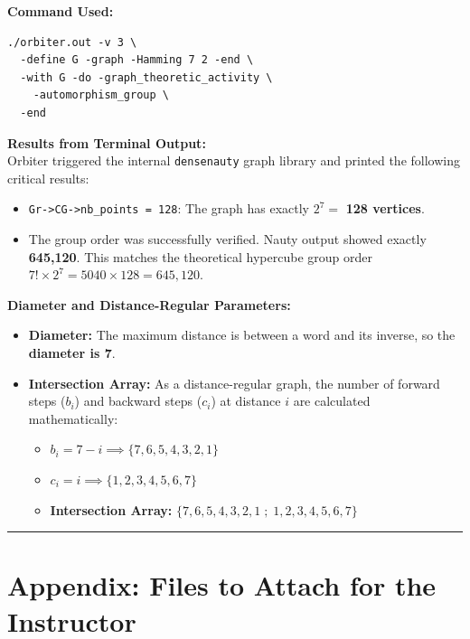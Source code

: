 \documentclass[12pt,a4paper]{article}
\begin{document}
\vspace{0.3cm}\noindent\textbf{Command Used:}
\begin{verbatim}
./orbiter.out -v 3 \
  -define G -graph -Hamming 7 2 -end \
  -with G -do -graph_theoretic_activity \
    -automorphism_group \
  -end
\end{verbatim}

\textbf{Results from Terminal Output:}\\
Orbiter triggered the internal \texttt{densenauty} graph library and printed the following critical results:
\begin{itemize}
    \item \texttt{Gr->CG->nb\_points = 128}: The graph has exactly $2^7 =$ \textbf{128 vertices}.
    \item The group order was successfully verified. Nauty output showed exactly \textbf{645,120}. This matches the theoretical hypercube group order $7! \times 2^7 = 5040 \times 128 = 645,120$.
\end{itemize}

\textbf{Diameter and Distance-Regular Parameters:}
\begin{itemize}
    \item \textbf{Diameter:} The maximum distance is between a word and its inverse, so the \textbf{diameter is 7}.
    \item \textbf{Intersection Array:} As a distance-regular graph, the number of forward steps ($b_i$) and backward steps ($c_i$) at distance $i$ are calculated mathematically:
    \begin{itemize}
        \item $b_i = 7 - i \implies \{7, 6, 5, 4, 3, 2, 1\}$
        \item $c_i = i \implies \{1, 2, 3, 4, 5, 6, 7\}$
        \item \textbf{Intersection Array:} $\{7, 6, 5, 4, 3, 2, 1 \; ; \; 1, 2, 3, 4, 5, 6, 7\}$
    \end{itemize}
\end{itemize}

\vspace{0.5cm}
\hrule
\vspace{0.5cm}

\section*{Appendix: Files to Attach for the Instructor}
\end{document}
